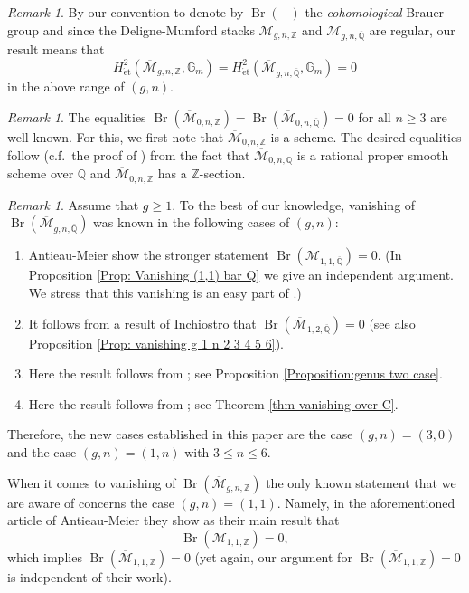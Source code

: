 \documentclass{amsart}
\theoremstyle{definition}
\theoremstyle{remark}
\newtheorem{remark}[prop]{Remark}
\DeclareMathOperator{\Br}{Br}
\newcommand{\Q}{\mathbb{Q}}
\newcommand{\ZZ}{\mathbb Z}
\newcommand{\QQ}{\mathbb Q}
\newcommand{\et}{\operatorname{\acute{e}t}}%
\begin{document}
\begin{remark}
    By our convention to denote by $\Br(-)$ the \textit{cohomological} Brauer group and since the Deligne-Mumford stacks $\overline{\mathcal{M}}_{g,n,\ZZ}$ and $\overline{\mathcal{M}}_{g,n,\overline{\Q}}$ are regular, our result means that
    $$
    H^{2}_{\et}(\overline{\mathcal{M}}_{g,n,\ZZ},\mathbb{G}_{m})=H^{2}_{\et}(\overline{\mathcal{M}}_{g,n,\overline{\Q}},\mathbb{G}_{m})=0
    $$
    in the above range of $(g,n).$
\end{remark}


\begin{remark}\label{Remark:genus zero case}
    The equalities
    $
    \Br(\overline{\mathcal{M}}_{0,n,\ZZ})=\Br(\overline{\mathcal{M}}_{0,n,\overline{\Q}})=0
    $
    for all $n \geq 3$ are well-known.
    For this, we first note that $\overline{\mathcal{M}}_{0,n,\ZZ}$ is a scheme.
    The desired equalities follow (c.f.\ the proof of \cite[Lemma 6.9.8]{Poonen}) from the fact that $\overline{\mathcal{M}}_{0,n,\Q}$
    is a rational proper smooth scheme over $\Q$ and $\overline{\mathcal{M}}_{0,n, \ZZ}$ has a $\ZZ$-section.
    \end{remark}




\begin{remark}\label{Remark: previous studies}
Assume that $g \geq 1$.
To the best of our knowledge, vanishing of $\Br(\overline{\mathcal{M}}_{g,n,\overline{\Q}})$ was known in the following cases of $(g,n)$:
\begin{enumerate}
    \item [(1,1):] Antieau-Meier \cite{AntieauMeierBrauerElliptic} show the stronger statement $\Br(\mathcal{M}_{1,1,\overline{\Q}})=0$.
    (In Proposition \ref{Prop: Vanishing (1,1) bar Q} we give an independent argument.
    We stress that this vanishing is an easy part of \cite{AntieauMeierBrauerElliptic}.)
    \item [(1,2):] It follows from a result of Inchiostro \cite[Theorem 1.2]{InchiostrobarM1_2} that $\Br(\overline{\mathcal{M}}_{1,2, \overline{\QQ}})=0$ (see also Proposition \ref{Prop: vanishing g 1 n 2 3 4 5 6}).
    \item [(2,0):] Here the result follows from \cite{DiLorenzo-PirisiHyperEllEven}; see Proposition \ref{Proposition:genus two case}.
    \item [$g\geq 4:$] Here the result follows from \cite{SecondHomologyGenusGEQ4}; see Theorem \ref{thm vanishing over C}. 
\end{enumerate}
Therefore, the new cases established in this paper are the case $(g, n)=(3, 0)$
and the case
$(g, n)=(1,n)$ with  $3\leq n \leq 6$.

When it comes to vanishing of $\Br(\overline{\mathcal{M}}_{g,n,\ZZ})$ the only known statement that we are aware of concerns the case $(g, n)=(1,1).$ Namely, in the aforementioned article of Antieau-Meier \cite{AntieauMeierBrauerElliptic} they show as their main result that
$$
\Br(\mathcal{M}_{1,1,\ZZ})=0,
$$
which implies $\Br(\overline{\mathcal{M}}_{1,1,\ZZ})=0$ (yet again, our argument for $\Br(\overline{\mathcal{M}}_{1,1,\ZZ})=0$ is independent of their work).
\end{remark}
\end{document}
